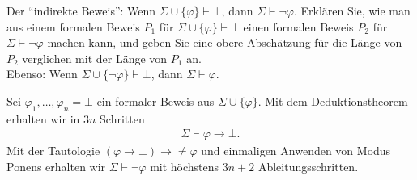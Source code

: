 
\begin{exercise}[98]

Der \enquote{indirekte Beweis}: Wenn $\Sigma \cup \{\varphi\} \vdash \bot$, dann
$\Sigma \vdash \neg \varphi$. Erklären Sie, wie man aus einem formalen Beweis
$P_1$ für $\Sigma \cup \{\varphi\} \vdash \bot$ einen formalen Beweis $P_2$
für $\Sigma \vdash \neg \varphi$ machen kann, und geben Sie eine obere
Abschätzung für die Länge von $P_2$ verglichen mit der Länge von $P_1$ an. \\
Ebenso: Wenn $\Sigma \cup \{\neg \varphi\} \vdash \bot$, dann $\Sigma \vdash \varphi$.

\end{exercise}


\begin{solution}

Sei $\varphi_1,\dots,\varphi_n = \bot$ ein formaler Beweis aus $\Sigma \cup \{\varphi\}$.
Mit dem Deduktionstheorem erhalten wir in $3n$ Schritten
\begin{align*}
  \Sigma \vdash \varphi \rightarrow \bot.
\end{align*}
Mit der Tautologie $(\varphi \rightarrow \bot) \rightarrow \neq \varphi$
und einmaligen Anwenden von Modus Ponens erhalten wir $\Sigma \vdash \neg \varphi$
mit höchstens $3n + 2$ Ableitungsschritten.

\end{solution}

